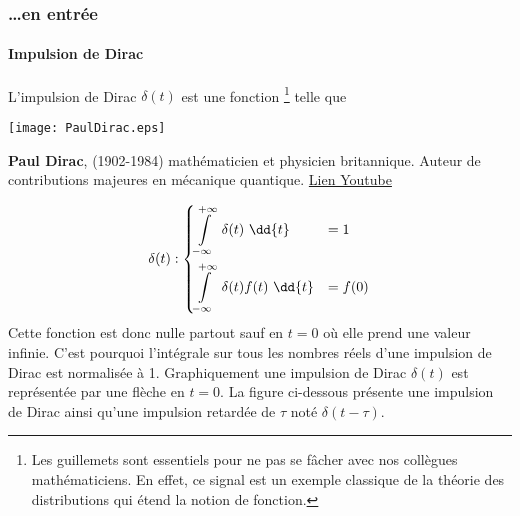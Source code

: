 \subsubsection{\ldots en entrée}
\paragraph{Impulsion de Dirac}
L'impulsion de Dirac
$\delta(t)$ est une \og fonction\fg 
\footnote{Les guillemets sont essentiels pour ne pas se fâcher avec 
nos collègues mathématiciens. En effet, ce signal est un exemple classique de 
la théorie des distributions qui étend la notion de fonction.} telle que
\begin{marginfigure}
    \centering
    \texttt{[image: PaulDirac.eps]} 
    \caption{\textbf{Paul Dirac}, (1902-1984) 
              mathématicien et physicien britannique. Auteur de 
              contributions majeures en mécanique quantique. 
              \href{https://www.youtube.com/watch?v=H7mOU1Xu-yA}{Lien Youtube}
              } 
\end{marginfigure}
\begin{align*}
    \delta(t) : 
    \begin{dcases}
    	\int\limits_{-\infty}^{+\infty}	 \delta(t)\,\,\dd{t}&=1   \\
        \int\limits_{-\infty}^{+\infty}  \delta(t)f(t)\,\,\dd{t}&=f(0)	
    \end{dcases}
\end{align*}
Cette fonction est donc nulle partout sauf en $t=0$ où elle prend 
une valeur infinie. C'est pourquoi l'intégrale sur tous les nombres réels 
d'une impulsion de Dirac est normalisée à 1.
Graphiquement une impulsion de Dirac $\delta(t)$ est 
représentée par une flèche en $t=0$. La figure ci-dessous présente 
une impulsion de Dirac ainsi qu'une 
impulsion retardée de $\tau$ noté $\delta(t-\tau)$.
